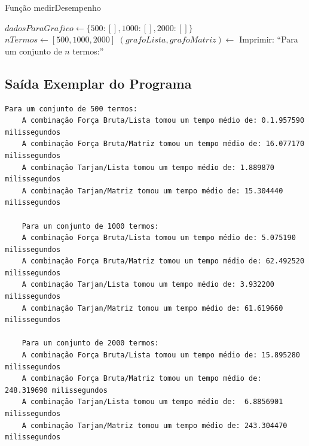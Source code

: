 \documentclass[12pt]{article}
\begin{document}
\vspace{1em}

\begin{algorithm}[H]
\caption{Função medirDesempenho}
\begin{algorithmic}[1]
    \State $dadosParaGrafico \gets \{500: [], 1000: [], 2000: []\}$
    \State $nTermos \gets [500, 1000, 2000]$
        \State $(grafoLista, grafoMatriz) \gets$ 
        \State Imprimir: ``Para um conjunto de $n$ termos:''

        \State {}
        \State {}
        \State {}
        \State {}
    \EndFor
\EndFunction
\end{algorithmic}
\end{algorithm}


\subsection{Saída Exemplar do Programa}

\begin{verbatim}
Para um conjunto de 500 termos:
    A combinação Força Bruta/Lista tomou um tempo médio de: 0.1.957590 milissegundos
    A combinação Força Bruta/Matriz tomou um tempo médio de: 16.077170 milissegundos
    A combinação Tarjan/Lista tomou um tempo médio de: 1.889870 milissegundos
    A combinação Tarjan/Matriz tomou um tempo médio de: 15.304440 milissegundos

    Para um conjunto de 1000 termos:
    A combinação Força Bruta/Lista tomou um tempo médio de: 5.075190 milissegundos
    A combinação Força Bruta/Matriz tomou um tempo médio de: 62.492520 milissegundos
    A combinação Tarjan/Lista tomou um tempo médio de: 3.932200 milissegundos
    A combinação Tarjan/Matriz tomou um tempo médio de: 61.619660 milissegundos

    Para um conjunto de 2000 termos:
    A combinação Força Bruta/Lista tomou um tempo médio de: 15.895280 milissegundos
    A combinação Força Bruta/Matriz tomou um tempo médio de: 248.319690 milissegundos
    A combinação Tarjan/Lista tomou um tempo médio de:  6.8856901 milissegundos
    A combinação Tarjan/Matriz tomou um tempo médio de: 243.304470 milissegundos
\end{verbatim}
\end{document}
